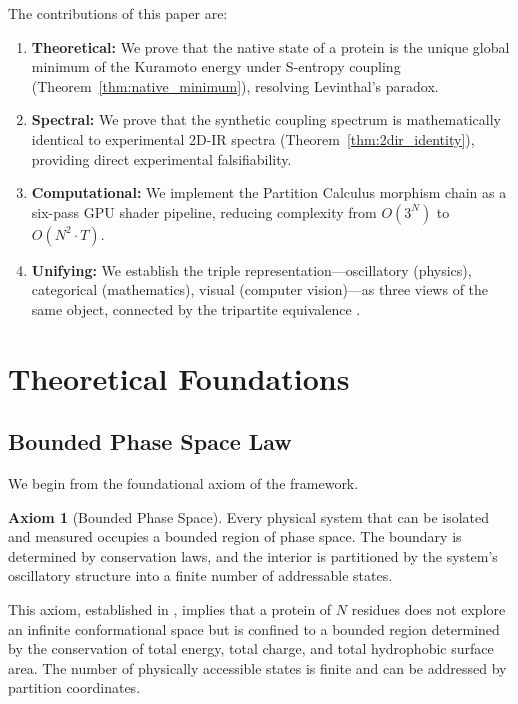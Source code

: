 \documentclass[11pt,twocolumn,a4paper]{article}
\theoremstyle{definition}
\newtheorem{axiom}{Axiom}
\theoremstyle{remark}
\begin{document}
\noindent The contributions of this paper are:
\begin{enumerate}
    \item \textbf{Theoretical:} We prove that the native state of a protein is the unique global minimum of the Kuramoto energy under S-entropy coupling (Theorem~\ref{thm:native_minimum}), resolving Levinthal's paradox.
    \item \textbf{Spectral:} We prove that the synthetic coupling spectrum is mathematically identical to experimental 2D-IR spectra (Theorem~\ref{thm:2dir_identity}), providing direct experimental falsifiability.
    \item \textbf{Computational:} We implement the Partition Calculus morphism chain as a six-pass GPU shader pipeline, reducing complexity from $O(3^N)$ to $O(N^2 \cdot T)$.
    \item \textbf{Unifying:} We establish the triple representation---oscillatory (physics), categorical (mathematics), visual (computer vision)---as three views of the same object, connected by the tripartite equivalence \citep{sachikonye2025_partition}.
\end{enumerate}

\section{Theoretical Foundations}
\label{sec:foundations}

\subsection{Bounded Phase Space Law}

We begin from the foundational axiom of the framework.

\begin{axiom}[Bounded Phase Space]
\label{ax:bounded}
Every physical system that can be isolated and measured occupies a bounded region of phase space. The boundary is determined by conservation laws, and the interior is partitioned by the system's oscillatory structure into a finite number of addressable states.
\end{axiom}

This axiom, established in \citet{sachikonye2025a}, implies that a protein of $N$ residues does not explore an infinite conformational space but is confined to a bounded region determined by the conservation of total energy, total charge, and total hydrophobic surface area. The number of physically accessible states is finite and can be addressed by partition coordinates.
\end{document}
